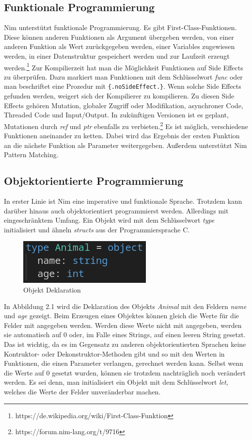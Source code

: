 \documentclass[11pt]{report}
\begin{document}
\subsection{Funktionale Programmierung}
Nim unterstützt funktionale Programmierung. Es gibt First-Class-Funktionen. Diese können anderen Funktionen als Argument übergeben werden, von einer anderen Funktion als Wert zurückgegeben werden, einer Variables zugewiesen werden, in einer Datenstruktur gespeichert werden und zur Laufzeit erzeugt werden.\footnote{https://de.wikipedia.org/wiki/First-Class-Funktion}
\newline
Zur Kompilierzeit hat man die Möglichkeit Funktionen auf Side Effects zu überprüfen. Dazu markiert man Funktionen mit dem Schlüsselwort \emph{func} oder man beschriftet eine Prozedur mit \verb|{.noSideEffect.}|. Wenn solche Side Effects gefunden werden, weigert sich der Kompilierer zu kompilieren. Zu diesen Side Effects gehören Mutation, globaler Zugriff oder Modifikation, asynchroner Code, Threaded Code und Input/Output. In zukünftigen Versionen ist es geplant, Mutationen durch \emph{ref} und \emph{ptr} ebenfalls zu verbieten.\footnote{https://forum.nim-lang.org/t/9716}
\newline
Es ist möglich, verschiedene Funktionen aneinander zu ketten. Dabei wird das Ergebnis der ersten Funktion an die nächste Funktion als Parameter weitergegeben.
\newline
Außerdem unterstützt Nim Pattern Matching.

\subsection{Objektorientierte Programmierung}
In erster Linie ist Nim eine imperative und funktionale Sprache. Trotzdem kann darüber hinaus auch objektorientiert programmierst werden. Allerdings mit eingeschränktem Umfang.
Ein Objekt wird mit dem Schlüsselwort \emph{type} initialisiert und ähneln \emph{structs} aus der Programmiersprache C.
\begin{figure}[htp]
\centering
\includegraphics[scale=0.50]{images/image1.png}
\caption{Objekt Deklaration}
\label{}
\end{figure}
In Abbildung 2.1 wird die Deklaration des Objekts \emph{Animal} mit den Feldern \emph{name} und \emph{age} gezeigt. Beim Erzeugen eines Objektes können gleich die Werte für die Felder mit angegeben werden. Werden diese Werte nicht mit angegeben, werden sie automatisch auf 0 oder, im Falle eines Strings, auf einen leeren String gesetzt. Das ist wichtig, da es im Gegensatz zu anderen objektorientierten Sprachen keine Kontruktor- oder Dekonstruktor-Methoden gibt und so mit den Werten in Funktionen, die einen Parameter verlangen, gerechnet werden kann. Selbst wenn die Werte auf 0 gesetzt wurden, können sie trotzdem nachträglich noch verändert werden. Es sei denn, man initialisiert ein Objekt mit dem Schlüsselwort \emph{let}, welches die Werte der Felder unveränderbar machen.
\end{document}
